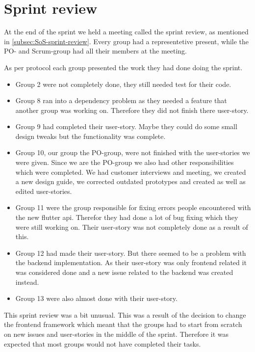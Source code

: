 \section{Sprint review}

At the end of the sprint we held a meeting called the sprint review, as mentioned in \ref{subsec:SoS-sprint-review}.
Every group had a representetive present, while the PO- and Scrum-group had all their members at the meeting.

As per protocol each group presented the work they had done doing the sprint.
\begin{itemize}
    \item Group 2 were not completely done, they still needed test for their code.
    \item Group 8 ran into a dependency problem as they needed a feature that another group was working on. Therefore they did not finish there user-story.
    \item Group 9 had completed their user-story. Maybe they could do some small design tweaks but the functionality was complete.
    \item Group 10, our group the PO-group, were not finished with the user-stories we were given. Since we are the PO-group we also had other responsibilities which were completed. We had customer interviews and meeting, we created a new design guide, we corrected outdated prototypes and created as well as edited user-stories.
    \item Group 11 were the group responsible for fixing errors people encountered with the new flutter api. Therefor they had done a lot of bug fixing which they were still working on. Their user-story was not completely done as a result of this.
    \item Group 12 had made their user-story. But there seemed to be a problem with the backend implementation. As their user-story was only frontend related it was considered done and a new issue related to the backend was created instead.
    \item Group 13 were also almost done with their user-story.
\end{itemize}

This sprint review was a bit unusual. This was a result of the decision to change the frontend framework which meant that the groups had to start from scratch on new issues and user-stories in the middle of the sprint.
Therefore it was expected that most groups would not have completed their tasks.

